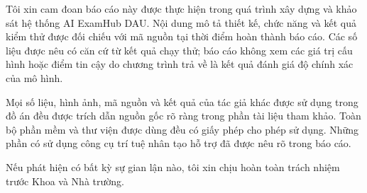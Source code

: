 \begin{declaration}

Tôi xin cam đoan báo cáo này được thực hiện trong quá trình xây dựng và
khảo sát hệ thống AI ExamHub DAU. Nội dung mô tả thiết kế, chức năng và kết
quả kiểm thử được đối chiếu với mã nguồn tại thời điểm hoàn thành báo cáo.
Các số liệu được nêu có căn cứ từ kết quả chạy thử; báo cáo không xem các
giá trị cấu hình hoặc điểm tin cậy do chương trình trả về là kết quả đánh
giá độ chính xác của mô hình.

Mọi số liệu, hình ảnh, mã nguồn và kết quả của tác giả khác được sử dụng
trong đồ án đều được trích dẫn nguồn gốc rõ ràng trong phần tài liệu tham
khảo. Toàn bộ phần mềm và thư viện được dùng đều có giấy phép cho phép sử
dụng. Những phần có sử dụng công cụ trí tuệ nhân tạo hỗ trợ đã được nêu rõ
trong báo cáo.

Nếu phát hiện có bất kỳ sự gian lận nào, tôi xin chịu hoàn toàn trách nhiệm
trước Khoa và Nhà trường.

\vspace{1.4em}
\hfill{}

\end{declaration}
